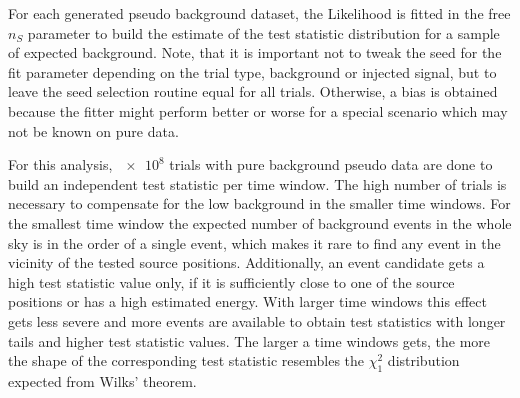 For each generated pseudo background dataset, the Likelihood is fitted in the free $n_S$ parameter to build the estimate of the test statistic distribution for a sample of expected background.
Note, that it is important not to tweak the seed for the fit parameter depending on the trial type, background or injected signal, but to leave the seed selection routine equal for all trials.
Otherwise, a bias is obtained because the fitter might perform better or worse for a special scenario which may not be known on pure data.

For this analysis, $\num{e8}$ trials with pure background pseudo data are done to build an independent test statistic per time window.
The high number of trials is necessary to compensate for the low background in the smaller time windows.
For the smallest time window the expected number of background events in the whole sky is in the order of a single event, which makes it rare to find any event in the vicinity of the tested source positions.
Additionally, an event candidate gets a high test statistic value only, if it is sufficiently close to one of the source positions or has a high estimated energy.
With larger time windows this effect gets less severe and more events are available to obtain test statistics with longer tails and higher test statistic values.
The larger a time windows gets, the more the shape of the corresponding test statistic resembles the $\chi^2_1$ distribution expected from Wilks' theorem.

